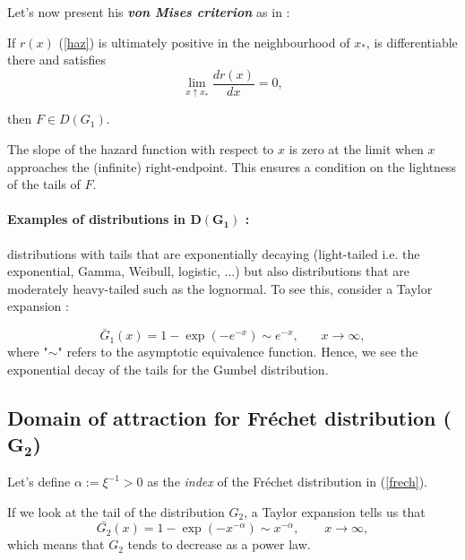 Let's now present his \emph{\textbf{von Mises criterion}} as in \cite[pp.73]{beirlant_statistics_2006}: 
\begin{theorem} If $r(x)$ (\ref{haz})
is ultimately positive in the neighbourhood of $x_*$, is differentiable there and satisfies 
\begin{equation}
\displaystyle{\lim_{x  \uparrow  x_*}} \frac{dr(x)}{dx}=0,
\end{equation}

then $F\in D(G_1)$. %
\end{theorem}
The slope of the hazard function with respect to $x$ is zero at the limit when $x$ approaches the (infinite) right-endpoint. This ensures a condition on the lightness of the tails of $F$.

\paragraph*{Examples of distributions in $\boldsymbol{D(G_1)}$ :} distributions with tails that are exponentially decaying (light-tailed i.e. the exponential, Gamma, Weibull, logistic, $\dots$) but also distributions that are moderately heavy-tailed such as the lognormal.
To see this, consider a Taylor expansion :

\begin{equation*}
\bar{G}_1(x)=1-\exp(-e^{-x})\sim e^{-x}, \ \ \ \ \ \ \ \ x\to\infty,
\end{equation*}
where "$\sim$" refers to the asymptotic equivalence function. Hence, we see the exponential decay of the tails for the Gumbel distribution.

\subsection*{Domain of attraction for Fréchet distribution ($\mathbf{G_{2}}$)}

Let's define $\alpha:=\xi^{-1}>0$ as the \emph{index} of the Fréchet distribution in (\ref{frech}).

\begin{definition}
If we look at the tail of the distribution $G_2$, a Taylor expansion tells us that
\begin{equation}\label{eq:powerlaw}
\bar{G_2}(x)=1-\exp (-x^{-\alpha})\sim x^{-\alpha}, \qquad x\to\infty, 
\end{equation}
which means that $G_2$ tends to decrease as a power law. 
\end{definition}


